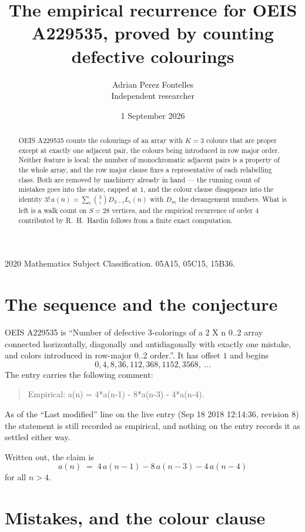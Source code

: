 \documentclass[11pt,a4paper]{article}
\title{The empirical recurrence for OEIS A229535, proved by counting defective colourings}
\author{Adrian Perez Fontelles\\ \small Independent researcher}
\date{1 September 2026}
\theoremstyle{plain}
\theoremstyle{definition}
\begin{document}
\maketitle

\begin{abstract}
OEIS A229535 counts the colourings of an array with $K=3$ colours that are proper except at
exactly one adjacent pair, the colours being introduced in row
major order. Neither feature is local: the number of monochromatic adjacent pairs is a
property of the whole array, and the row major clause fixes a representative of each
relabelling class. Both are removed by machinery already in hand --- the running count of
mistakes goes into the state, capped at $1$, and the colour clause disappears into the
identity $3!\,a(n)=\sum_i\binom{3}{i}D_{3-i}L_i(n)$ with $D_m$ the derangement
numbers. What is left is a walk count on $S=28$ vertices, and the empirical recurrence of
order $4$ contributed by R.~H.~Hardin follows from a finite exact computation.
\end{abstract}

\noindent\small 2020 Mathematics Subject Classification. 05A15, 05C15, 15B36.\normalsize

\section{The sequence and the conjecture}

OEIS A229535 is ``Number of defective 3-colorings of a 2 X n 0..2 array connected horizontally, diagonally and antidiagonally with exactly one mistake, and colors introduced in row-major 0..2 order.''. It has offset $1$ and begins
\[
0, 4, 8, 36, 112, 368, 1152, 3568,\ \dots
\]
The entry carries the following comment:
\begin{quote}\small
Empirical: a(n) = 4*a(n-1) - 8*a(n-3) - 4*a(n-4).
\end{quote}
As of the ``Last modified'' line on the live entry (Sep 18 2018 12:14:36, revision 8) the statement is
still recorded as empirical, and nothing on the entry records it as settled either way.

Written out, the claim is
\begin{equation}\label{eq:conj}
a(n)\;=\;4\,a(n-1) - 8\,a(n-3) - 4\,a(n-4)
\end{equation}
for all $n>4$.

\section{Mistakes, and the colour clause}
\end{document}
